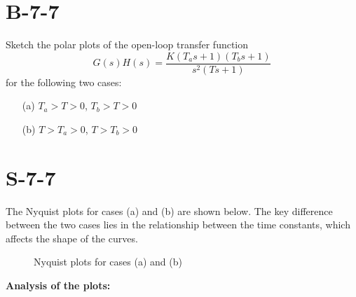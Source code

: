 \documentclass{article}
\begin{document}
\section*{B-7-7}
Sketch the polar plots of the open-loop transfer function
\[
G(s)H(s) = \frac{K(T_as + 1)(T_bs + 1)}{s^2(Ts + 1)}
\]
for the following two cases:
\begin{itemize}
    \item[(a)] $T_a > T > 0$, \quad $T_b > T > 0$
    \item[(b)] $T > T_a > 0$, \quad $T > T_b > 0$
\end{itemize}

\section*{S-7-7}
The Nyquist plots for cases (a) and (b) are shown below. The key difference between the two cases lies in the relationship between the time constants, which affects the shape of the curves.

\begin{figure}[H]
    \centering
    \caption{Nyquist plots for cases (a) and (b)}
\end{figure}

\textbf{Analysis of the plots:}
\end{document}
